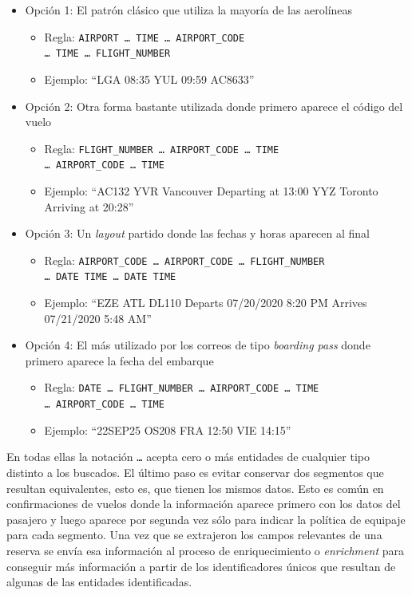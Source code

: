\begin{itemize}
    \item Opción 1: El patrón clásico que utiliza la mayoría de las aerolíneas
    \begin{itemize}
        \item Regla:
        \texttt{AIRPORT \ldots\ TIME \ldots\ AIRPORT\_CODE}\\
        \texttt{\ldots\ TIME \ldots\ FLIGHT\_NUMBER}
        \item Ejemplo: ``LGA 08:35 YUL 09:59 AC8633''
    \end{itemize}
    \item Opción 2: Otra forma bastante utilizada donde primero aparece el código del vuelo
    \begin{itemize}
        \item Regla:
        \texttt{FLIGHT\_NUMBER \ldots\ AIRPORT\_CODE \ldots\ TIME}\\
        \texttt{\ldots\ AIRPORT\_CODE \ldots\ TIME}
        \item Ejemplo: ``AC132 YVR Vancouver Departing at 13:00 YYZ Toronto Arriving at 20:28''
    \end{itemize}
    \item Opción 3: Un \textit{layout} partido donde las fechas y horas aparecen al final
    \begin{itemize}
        \item Regla:
        \texttt{AIRPORT\_CODE \ldots\ AIRPORT\_CODE \ldots\ FLIGHT\_NUMBER}\\
        \texttt{\ldots\ DATE TIME \ldots\ DATE TIME}
        \item Ejemplo: ``EZE ATL DL110 Departs 07/20/2020 8:20 PM Arrives 07/21/2020 5:48 AM''
    \end{itemize}
    \item Opción 4: El más utilizado por los correos de tipo \textit{boarding pass} donde primero aparece la fecha del embarque
    \begin{itemize}
        \item Regla:
        \texttt{DATE \ldots\ FLIGHT\_NUMBER \ldots\ AIRPORT\_CODE \ldots\ TIME}\\
        \texttt{\ldots\ AIRPORT\_CODE \ldots\ TIME}
        \item Ejemplo: ``22SEP25 OS208 FRA 12:50 VIE 14:15''
    \end{itemize}
\end{itemize}

En todas ellas la notación \texttt{\ldots} acepta cero o más entidades de cualquier tipo distinto a los buscados.
El último paso es evitar conservar dos segmentos que resultan equivalentes, esto es, que tienen los mismos datos.
Esto es común en confirmaciones de vuelos donde la información aparece primero con los datos del pasajero y luego
aparece por segunda vez sólo para indicar la política de equipaje para cada segmento.
Una vez que se extrajeron los campos relevantes de una reserva se envía esa información al proceso de enriquecimiento o
\textit{enrichment} para conseguir más información a partir de los identificadores únicos que resultan de algunas de las
entidades identificadas.

